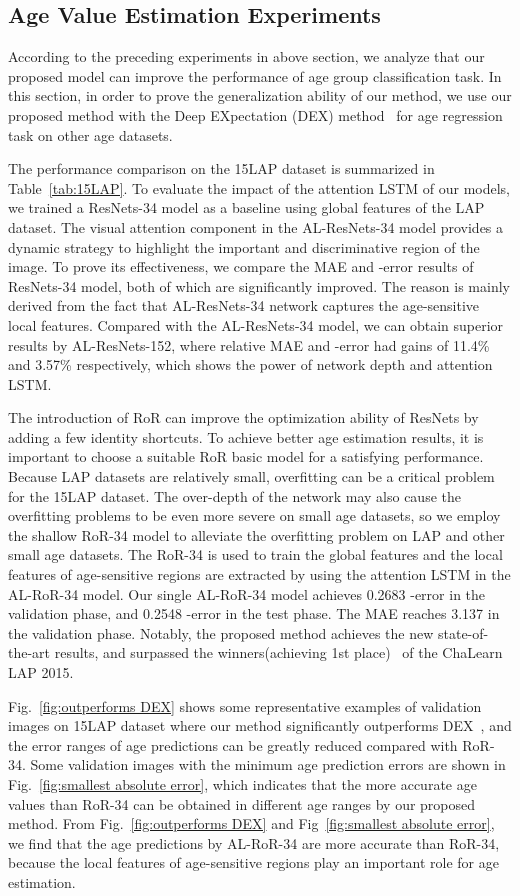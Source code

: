 \documentclass[journal]{IEEEtran}
\begin{document}
\subsection{Age Value Estimation Experiments}
According to the preceding experiments in above section, we analyze that our proposed model can improve the performance of age group classification task. In this section, in order to prove the generalization ability of our method, we use our proposed method with the Deep EXpectation (DEX) method~\cite{ref-19} for age regression task on other age datasets.
\par
The performance comparison on the 15LAP dataset is summarized in Table~\ref{tab:15LAP}. To evaluate the impact of the attention LSTM of our models, we trained a ResNets-34 model as a baseline using global features of the LAP dataset. The visual attention component in the AL-ResNets-34 model provides a dynamic strategy to highlight the important and discriminative region of the image. To prove its effectiveness, we compare the MAE and -error results of ResNets-34 model, both of which are significantly improved. The reason is mainly derived from the fact that AL-ResNets-34 network captures the age-sensitive local features. Compared with the AL-ResNets-34 model, we can obtain superior results by AL-ResNets-152, where relative MAE and -error had gains of 11.4\% and 3.57\% respectively, which shows the power of network depth and attention LSTM.
\par
The introduction of RoR can improve the optimization ability of ResNets by adding a few identity shortcuts. To achieve better age estimation results, it is important to choose a suitable RoR basic model for a satisfying performance. Because LAP datasets are relatively small, overfitting can be a critical problem for the 15LAP dataset. The over-depth of the network may also cause the overfitting problems to be even more severe on small age datasets, so we employ the shallow RoR-34 model to alleviate the overfitting problem on LAP and other small age datasets. The RoR-34 is used to train the global features and the local features of age-sensitive regions are extracted by using the attention LSTM in the AL-RoR-34 model. Our single AL-RoR-34 model achieves 0.2683 -error in the validation phase, and 0.2548 -error in the test phase. The MAE reaches 3.137 in the validation phase. Notably, the proposed method achieves the new state-of-the-art  results, and surpassed the winners(achieving 1st place)~\cite{ref-47} of the ChaLearn LAP 2015.
\par
Fig.~\ref{fig:outperforms DEX} shows some representative examples of validation images on 15LAP dataset where our method significantly outperforms DEX~\cite{ref-47}, and the error ranges of age predictions can be greatly reduced compared with RoR-34. Some validation images with the minimum age prediction errors are shown in Fig.~\ref{fig:smallest absolute error}, which indicates that the more accurate age values than RoR-34 can be obtained in different age ranges by our proposed method. From Fig.~\ref{fig:outperforms DEX} and Fig~\ref{fig:smallest absolute error}, we find that the age predictions by AL-RoR-34 are more accurate than RoR-34, because the local features of age-sensitive regions play an important role for age estimation.
\end{document}
